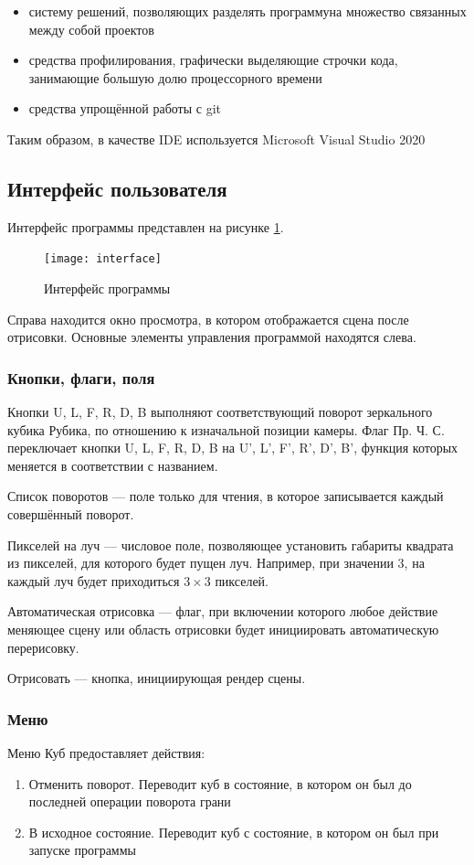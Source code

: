 \begin{itemize}
	\item систему решений, позволяющих разделять программуна множество связанных между собой проектов
	\item средства профилирования, графически выделяющие строчки кода, занимающие большую долю процессорного времени
	\item средства упрощённой работы с git
\end{itemize}

Таким образом, в качестве IDE используется Microsoft Visual Studio 2020

\subsection{Интерфейс пользователя}
Интерфейс программы представлен на рисунке \ref{fig:interface}.

\begin{figure}[ht]
	\centering
	\texttt{[image: interface]}
	\caption{Интерфейс программы}
	\label{fig:interface}
\end{figure}

Справа находится окно просмотра, в котором отображается сцена после отрисовки. Основные элементы управления программой находятся слева.

\subsubsection{Кнопки, флаги, поля}
Кнопки U, L, F, R, D, B выполняют соответствующий поворот зеркального кубика Рубика, по отношению к изначальной позиции камеры. Флаг Пр. Ч. С. переключает кнопки U, L, F, R, D, B на U', L', F', R', D', B', функция которых меняется в соответствии с названием.

Список поворотов --- поле только для чтения, в которое записывается каждый совершённый поворот.

Пикселей на луч --- числовое поле, позволяющее установить габариты квадрата из пикселей, для которого будет пущен луч. Например, при значении 3, на каждый луч будет приходиться $3\times 3$ пикселей.

Автоматическая отрисовка --- флаг, при включении которого любое действие меняющее сцену или область отрисовки будет инициировать автоматическую перерисовку.

Отрисовать --- кнопка, инициирующая рендер сцены.

\subsubsection{Меню}
Меню Куб предоставляет действия:
\begin{enumerate}
	\item Отменить поворот. Переводит куб в состояние, в котором он был до последней операции поворота грани
	\item В исходное состояние. Переводит куб с состояние, в котором он был при запуске программы
\end{enumerate}


